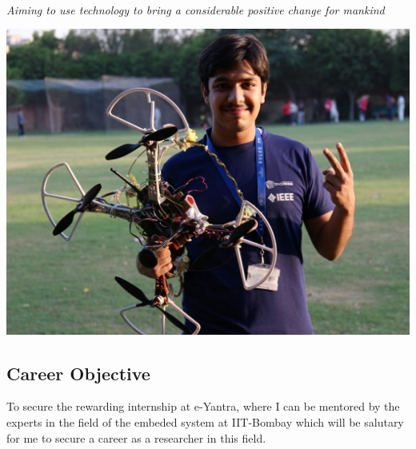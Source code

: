 \documentclass[11pt]{article}
\begin{document}
\begin{mdframed}[backgroundcolor=orange]
~
\begin{center}
\begin{Huge}
\end{Huge}
\end{center}
\begin{center}
\begin{large}
\color{white}\emph{Aiming to use technology to bring a considerable positive change for mankind}
\end{large}
\end{center}
\end{mdframed}
\begin{minipage}{1.00\linewidth}
\begin{center}
\includegraphics[scale=0.169]{siddhant_image}
\end{center}

\begin{flushleft}
\section{\color{red}Car\color{purple}e\color{black}er Obje\color{purple}ct\color{black}ive}
To secure the rewarding internship at e-Yantra, where I can be mentored by the experts in the field of the embeded system at IIT-Bombay which will be salutary for me to secure a career as a researcher in this field.

\end{flushleft}
\end{minipage}
\end{document}
